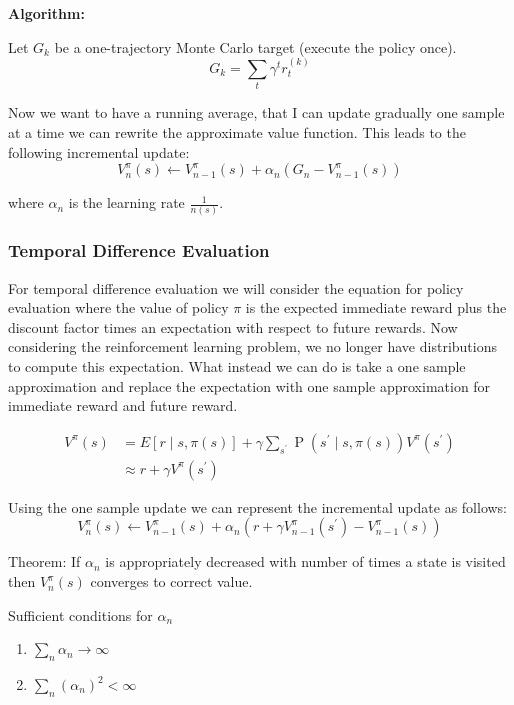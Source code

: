 \documentclass[12pt]{article}
\begin{document}
            \textbf{Algorithm:}
            
            Let $G_k$ be a one-trajectory Monte Carlo target (execute the policy once).
            $$ G_k = \sum_t \gamma^t r_t^{(k)} $$

            Now we want to have a running average, that I can update gradually one sample at a time we can rewrite the
            approximate value function. This leads to the following incremental update:
            $$ V_{n}^{\pi}(s) \leftarrow V_{n-1}^{\pi}(s)+\alpha_{n}\left(G_{n}-V_{n-1}^{\pi}(s)\right) $$

            where $\alpha_n$ is the learning rate $\frac{1}{n(s)}$.

        \subsubsection{Temporal Difference Evaluation}
            For temporal difference evaluation we will consider the equation for policy evaluation where the value of
            policy $\pi$ is the expected immediate reward plus the discount factor times an expectation with respect to
            future rewards. Now considering the reinforcement learning problem, we no longer have distributions to
            compute this expectation. What instead we can do is take a one sample approximation and replace the
            expectation with one sample approximation for immediate reward and future reward. 

            \begin{align*}
            V^{\pi}(s) &=E[r \mid s, \pi(s)]+\gamma \sum_{s^{\prime}} \operatorname{P}\left(s^{\prime} \mid s, \pi(s)\right) V^{\pi}\left(s^{\prime}\right) \\
            & \approx r+\gamma V^{\pi}\left(s^{\prime}\right)
            \end{align*}

            Using the one sample update we can represent the incremental update as follows:
            $$ V_{n}^{\pi}(s) \leftarrow V_{n-1}^{\pi}(s)+\alpha_{n}\left(r+\gamma
            V_{n-1}^{\pi}\left(s^{\prime}\right)-V_{n-1}^{\pi}(s)\right) $$

            Theorem: If $\alpha_{n}$ is appropriately decreased with number of times a state is visited then
            $V_{n}^{\pi}(s)$ converges to correct value.
            
            Sufficient conditions for $\alpha_{n}$
            \begin{enumerate}
                \item $\sum_{n} \alpha_{n} \rightarrow \infty$
                \item $\sum_{n}\left(\alpha_{n}\right)^{2}<\infty$
            \end{enumerate}
\end{document}
